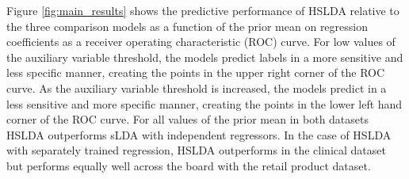Figure \ref{fig:main_results} shows the predictive performance of HSLDA 
relative to the three comparison models as a function of the prior mean
on regression coefficients as a receiver operating characteristic (ROC) curve. 
For low values of the auxiliary variable
threshold, the models predict labels in a more sensitive and less specific
manner, creating the points in the upper right corner of the ROC curve. As
the auxiliary variable threshold is increased, the models predict in a less
sensitive and more specific manner, creating the points in the lower left
hand corner of the ROC curve. For all values of the prior mean in both datasets
HSLDA outperforms sLDA with independent regressors. In the case of HSLDA with
separately trained regression, HSLDA outperforms in the clinical dataset but
performs equally well across the board with the retail product dataset.

